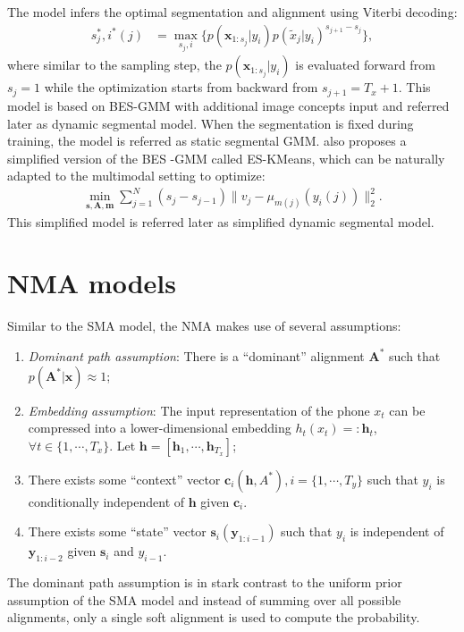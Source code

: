 \documentclass[journal]{IEEEtran}
\begin{document}
 The model infers the optimal segmentation and alignment using Viterbi decoding:
\begin{align}\label{eq:decode_besgmm}
    s_j^*, i^*(j) &= \max_{s_j, i}\{p(\mathbf x_{1:s_j}|y_{i})p(\tilde{x}_j|y_{i})^{s_{j+1}-s_j}\},
\end{align}
where similar to the sampling step, the $p(\mathbf x_{1:s_j}|y_{i})$ is evaluated forward from $s_j=1$ while the optimization starts from backward from $s_{j+1}=T_x+1$. This model is based on BES-GMM \cite{Kamper2017} with additional image concepts input and referred later as dynamic segmental model. When the segmentation is fixed during training, the model is referred as static segmental GMM. \cite{Kamper2017} also proposes a simplified version of the BES -GMM called ES-KMeans, which can be naturally adapted to the multimodal setting to optimize:
\begin{align}\label{eq:objective_multimodal_eskmeans}
    \min_{\mathbf s, \mathbf A, \mathbf m}\sum_{j=1}^{N}(s_j-s_{j-1})\|v_j - \mu_{m(j)}(y_i(j))\|_2^2.
\end{align}
This simplified model is referred later as simplified dynamic segmental model.

\section{NMA models}
Similar to the SMA model, the NMA makes use of several assumptions:
\begin{enumerate}
    \item \textit{Dominant path assumption}: There is a ``dominant'' alignment $\mathbf A^*$ such that $p(\mathbf A^*|\mathbf x) \approx 1$;
    \item \textit{Embedding assumption}: The input representation of the phone $x_t$ can be compressed into a lower-dimensional embedding $h_t(x_t) =: \mathbf h_t$, $\forall t \in \{1, \cdots, T_x\}$. Let $\mathbf h = [\mathbf h_1, \cdots, \mathbf h_{T_x}]$;
    \item There exists some ``context'' vector $\mathbf c_i(\mathbf h, A^*), i=\{1, \cdots, T_y\}$ such that $y_i$ is conditionally independent of $\mathbf h$ given $\mathbf c_i$.
    \item There exists some ``state'' vector $\mathbf s_i(\mathbf y_{1:i-1})$ such that $y_i$ is independent of $\mathbf y_{1:i-2}$ given $\mathbf s_i$ and $y_{i-1}$.
\end{enumerate}
The dominant path assumption is in stark contrast to the uniform prior assumption of the SMA model and instead of summing over all possible alignments, only a single soft alignment is used to compute the probability. 
\end{document}
